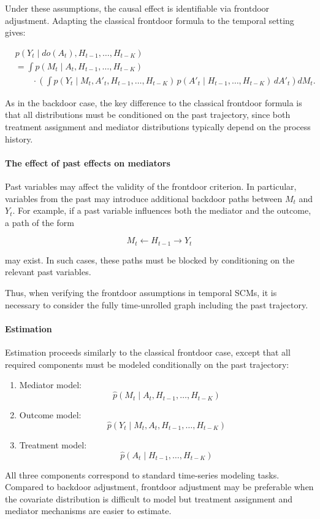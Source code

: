 \documentclass[11pt]{article}
\theoremstyle{definition}
\theoremstyle{remark}
\begin{document}
Under these assumptions, the causal effect is identifiable via frontdoor adjustment. Adapting the classical frontdoor formula to the temporal setting gives:

\begin{equation}
\begin{aligned}
&p(Y_t \mid do(A_t), H_{t-1},\dots,H_{t-K}) \\
&=
\int p(M_t \mid A_t, H_{t-1},\dots,H_{t-K}) \\
&\qquad \cdot
\left(
\int p(Y_t \mid M_t, A'_t, H_{t-1},\dots,H_{t-K}) \,
p(A'_t \mid H_{t-1},\dots,H_{t-K})
\, dA'_t
\right)
dM_t.
\end{aligned}
\end{equation}

As in the backdoor case, the key difference to the classical frontdoor formula is that all distributions must be conditioned on the past trajectory, since both treatment assignment and mediator distributions typically depend on the process history.

\paragraph{The effect of past effects on mediators}

Past variables may affect the validity of the frontdoor criterion. In particular, variables from the past may introduce additional backdoor paths between $M_t$ and $Y_t$. For example, if a past variable influences both the mediator and the outcome, a path of the form

\[
M_t \leftarrow H_{t-1} \rightarrow Y_t
\]

may exist. In such cases, these paths must be blocked by conditioning on the relevant past variables.

Thus, when verifying the frontdoor assumptions in temporal SCMs, it is necessary to consider the fully time-unrolled graph including the past trajectory.

\paragraph{Estimation}

Estimation proceeds similarly to the classical frontdoor case, except that all required components must be modeled conditionally on the past trajectory:

\begin{enumerate}

\item Mediator model:
\[
\hat{p}(M_t \mid A_t, H_{t-1},\dots,H_{t-K})
\]

\item Outcome model:
\[
\hat{p}(Y_t \mid M_t, A_t, H_{t-1},\dots,H_{t-K})
\]

\item Treatment model:
\[
\hat{p}(A_t \mid H_{t-1},\dots,H_{t-K})
\]

\end{enumerate}

All three components correspond to standard time-series modeling tasks. Compared to backdoor adjustment, frontdoor adjustment may be preferable when the covariate distribution is difficult to model but treatment assignment and mediator mechanisms are easier to estimate.
\end{document}
